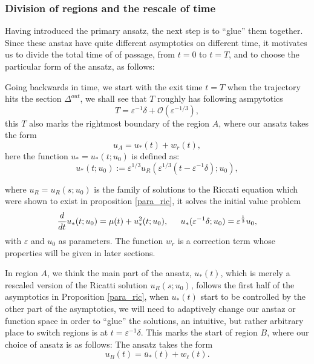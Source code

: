 \documentclass[letterpaper,11pt]{article}
\newcommand{\rmO}{\mathcal{O}}
\newcommand{\eps}{\varepsilon}
\numberwithin{equation}{section}
\theoremstyle{plain}
\begin{document}
\subsubsection{Division of regions and the rescale of time}\label{t_sigma}

Having introduced the primary ansatz, the next step is to ``glue'' them together. Since these anstaz have quite different asymptotics on different time, it motivates us to divide the total time of of passage, from $t=0$ to $t=T$, and to choose the particular form of the ansatz, as follows:

Going backwards in time, we start with the exit time $t=T$ when the trajectory hits the section $\Delta^{out}$, we shall see that $T$ roughly has following asmpytotics
\begin{equation}
T = \eps^{-1}\delta + \rmO(\eps^{-1/3}),
\end{equation}
this $T$ also marks the rightmost boundary of the region $A$, where our ansatz takes the form
\[
u_A = u_*(t)  + w_r(t),
\]
here the function $u_* = u_*(t; u_0)$ is defined as:
\begin{equation}\label{urdef}
u_*(t; u_0) := \eps^{1/3}u_R(\eps^{1/3}(t-\eps^{-1}\delta); u_0),
\end{equation}

where $u_R=u_R(s; u_0)$ is the family of solutions to the Riccati equation which were shown to exist in proposition \ref{para_ric}, it solves the initial value problem
\begin{equation}\label{ureq}
\frac{d}{dt}u_*(t; u_0) = \mu(t) + u_*^2(t; u_0), \hspace{0.2in} u_*(\eps^{-1}\delta; u_0) = \eps^{\frac{1}{3}} u_0,
\end{equation}
with $\eps$ and $u_0$ as parameters.  The function $w_r$ is a correction term whose properties will be given in later sections. 

In region $A$, we think the main part of the ansatz, $u_*(t)$, which is merely a rescaled version of the Ricatti solution $u_R(s; u_0)$, follows the first half of the asymptotics in Proposition \ref{para_ric}, when $u_*(t)$ start to be controlled by the other part of the asymptotics, we will need to adaptively change our anstaz or function space in order to ``glue'' the solutions, an intuitive, but rather arbitrary place to switch regions is at $t = \eps^{-1} \delta$. This marks the start of region $B$, where our choice of ansatz is as follows:
 The ansatz takes the form 
 \[ 
 u_B(t) = \bar{u}_*(t)  +w_\ell(t).
\]
\end{document}
